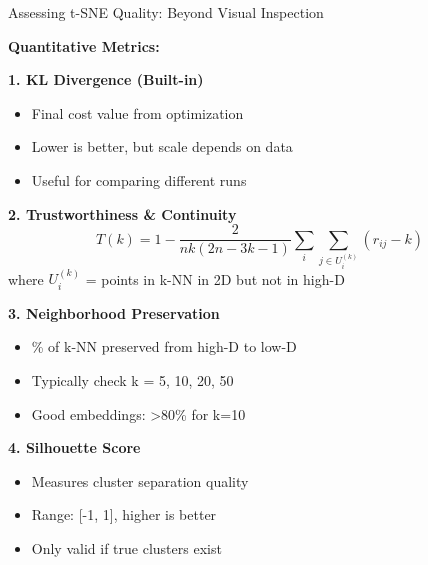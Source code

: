 \documentclass[10pt]{beamer}
\begin{document}
\begin{frame}{Assessing t-SNE Quality: Beyond Visual Inspection}

\textbf{Quantitative Metrics:}

\vspace{0.2cm}
\textbf{1. KL Divergence (Built-in)}
\begin{itemize}
    \setlength\itemsep{0em}
    \item Final cost value from optimization
    \item Lower is better, but scale depends on data
    \item Useful for comparing different runs
\end{itemize}

\vspace{0.15cm}
\textbf{2. Trustworthiness \& Continuity}
\begin{equation}
T(k) = 1 - \frac{2}{nk(2n-3k-1)} \sum_i \sum_{j \in U_i^{(k)}} (r_{ij} - k)
\end{equation}
where $U_i^{(k)}$ = points in k-NN in 2D but not in high-D

\vspace{0.15cm}
\textbf{3. Neighborhood Preservation}
\begin{itemize}
    \setlength\itemsep{0em}
    \item \% of k-NN preserved from high-D to low-D
    \item Typically check k = 5, 10, 20, 50
    \item Good embeddings: >80\% for k=10
\end{itemize}

\vspace{0.15cm}
\textbf{4. Silhouette Score}
\begin{itemize}
    \setlength\itemsep{0em}
    \item Measures cluster separation quality
    \item Range: [-1, 1], higher is better
    \item Only valid if true clusters exist
\end{itemize}

\end{frame}
\end{document}
